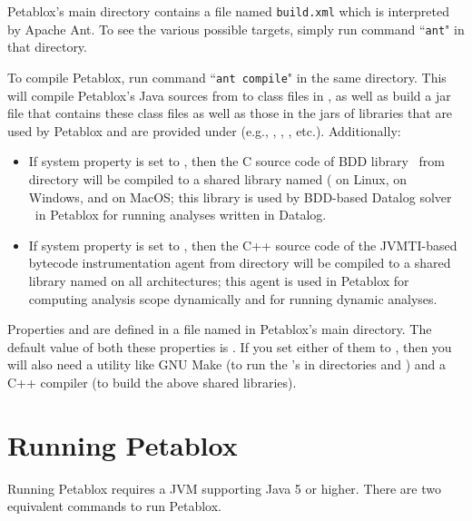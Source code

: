 Petablox's main directory contains a file named {\tt build.xml} which is
interpreted by Apache Ant.  To see the various possible targets, simply run
command ``{\tt ant}" in that directory.

To compile Petablox, run command ``{\tt ant compile}" in the same directory.  This
will compile Petablox's Java sources from  to class files in
, as well as build a jar file  that contains
these class files as well as those in the jars of libraries that are used by
Petablox and are provided under  (e.g., ,
, , etc.).  Additionally:

\begin{itemize}
\item

If system property  is set to , then the C
source code of BDD library \buddy\ from directory  will be compiled
to a shared library named ( on Linux,  on
Windows, and  on MacOS; this library is used by BDD-based
Datalog solver \bddbddb\ in Petablox for running analyses written in Datalog.

\item

If system property  is set to , then the C++
source code of the JVMTI-based bytecode instrumentation agent from directory
 will be compiled to a shared library named
 on all architectures; this agent is used in Petablox
for computing analysis scope dynamically and for running dynamic analyses.
\end{itemize}

Properties  and  are defined in a
file named  in Petablox's main directory.  The default value
of both these properties is .  If you set either of them to
, then you will also need a utility like GNU Make (to run the
's in directories  and ) and a C++
compiler (to build the above shared libraries).

\section{Running Petablox}
\label{sec:running-petablox}

Running Petablox requires a JVM supporting Java 5 or higher.  There are two
equivalent commands to run Petablox.

